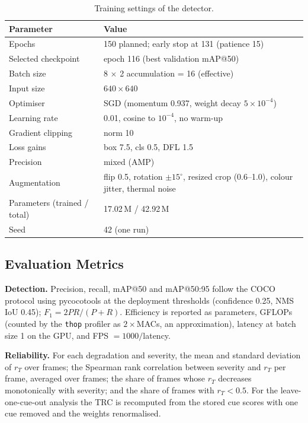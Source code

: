 \documentclass[journal]{IEEEtran}
\newcommand{\rT}{r_T}
\begin{document}
\begin{table}[!t]
\centering
\caption{Training settings of the detector.}
\label{tab:train}
\footnotesize
\begin{tabular}{@{}p{}p{}@{}}
\toprule
Parameter & Value \\
\midrule
Epochs & 150 planned; early stop at 131 (patience 15) \\
Selected checkpoint & epoch 116 (best validation mAP@50) \\
Batch size & 8 $\times$ 2 accumulation = 16 (effective) \\
Input size & $640\times640$ \\
Optimiser & SGD (momentum 0.937, weight decay $5\times10^{-4}$) \\
Learning rate & 0.01, cosine \cite{sgdr} to $10^{-4}$, no warm-up \\
Gradient clipping & norm 10 \\
Loss gains & box 7.5, cls 0.5, DFL 1.5 \\
Precision & mixed (AMP) \\
Augmentation & flip 0.5, rotation $\pm15^\circ$, resized crop (0.6--1.0), colour jitter, thermal noise \\
Parameters (trained / total) & 17.02\,M / 42.92\,M \\
Seed & 42 (one run) \\
\bottomrule
\end{tabular}
\end{table}

\subsection{Evaluation Metrics}
\textbf{Detection.} Precision, recall, mAP@50 and mAP@50:95 follow the COCO protocol \cite{coco} using pycocotools at the deployment thresholds (confidence 0.25, NMS IoU 0.45); $F_1=2PR/(P+R)$. Efficiency is reported as parameters, GFLOPs (counted by the \texttt{thop} profiler as $2\times$MACs, an approximation), latency at batch size 1 on the GPU, and FPS $=1000/$latency.

\textbf{Reliability.} For each degradation and severity, the mean and standard deviation of $\rT$ over frames; the Spearman rank correlation between severity and $\rT$ per frame, averaged over frames; the share of frames whose $\rT$ decreases monotonically with severity; and the share of frames with $\rT<0.5$. For the leave-one-cue-out analysis the TRC is recomputed from the stored cue scores with one cue removed and the weights renormalised.
\end{document}
